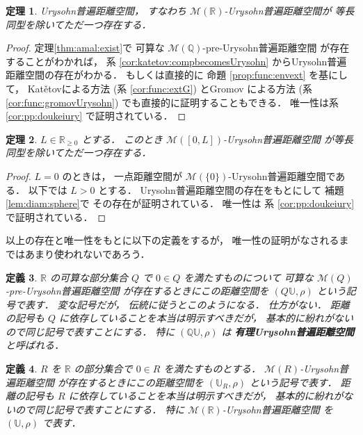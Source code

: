 \documentclass[leqno, 12pt]{jsarticle}
\newtheorem{thm}{定理}[section]
\newtheorem{df}[thm]{定義}
\renewcommand{\qq}{\mathbb{Q}}
\newcommand{\rr}{\mathbb{R}}
\newcommand{\Met}[1]{\mathscr{M}(#1)}
\newcommand{\Ury}{\mathbb{U}}
\newcommand{\UryOf}[1]{\Ury_{#1}}
\newcommand{\PreUryOf}[1]{#1\Ury}
\begin{document}
\begin{thm}\label{thm:intro:existpropUry}
Urysohn普遍距離空間，
すなわち
$\Met{\rr}$-Urysohn普遍距離空間が
等長同型を除いてただ一つ存在する．
\end{thm}
\begin{proof}
定理\ref{thm:amal:exist}で
可算な
$\Met{\qq}$-pre-Urysohn普遍距離空間
が存在することがわかれば，
系 \ref{cor:katetov:compbecomesUrysohn}
からUrysohn普遍距離空間の存在がわかる．
もしくは直接的に
命題
\ref{prop:func:envext}
を基にして，
Kat\v{e}tovによる方法
(系 \ref{cor:func:extG})
とGromov による方法
(系 \ref{cor:func:gromovUrysohn})
でも直接的に証明することもできる．
唯一性は系
\ref{cor:pp:doukeiury}
で証明されている．
\end{proof}


\begin{thm}\label{thm:intro:existdiam}
$L\in \rr_{\ge 0}$
とする．%
このとき
$\Met{[0, L]}$-Urysohn普遍距離空間
が等長同型を除いてただ一つ存在する．
\end{thm}


\begin{proof}
$L=0$
のときは，
一点距離空間が
$\Met{\{0\}}$-Urysohn普遍距離空間である．
以下では
$L>0$
とする．
Urysohn普遍距離空間の存在をもとにして
補題
\ref{lem:diam:sphere}で
その存在が証明されている．
唯一性は
系
\ref{cor:pp:doukeiury}
で証明されている．
\end{proof}


以上の存在と唯一性をもとに以下の定義をするが，
唯一性の証明がなされるまではあまり使われないであろう．



\begin{df}\label{df:intro:preUrysohnspaces}
$\rr$
の可算な部分集合
$Q$
で
$0\in Q$
を満たすものについて
可算な
$\Met{Q}$-pre-Urysohn普遍距離空間
が存在するときにこの距離空間を
$(\PreUryOf{Q}, \rho)$
という記号で表す．
変な記号だが，
伝統に従うとこのようになる．%
仕方がない．
距離の記号も
$Q$
に依存していることを本当は明示すべきだが，
基本的に紛れがないので同じ記号で表すことにする．
特に
$(\PreUryOf{\qq}, \rho)$
は
\textbf{有理Urysohn普遍距離空間}
と呼ばれる．
\end{df}




\begin{df}\label{df:intro:Urysohnspaces}
$R$
を
$\rr$
の部分集合で
$0\in R$
を満たすものとする．
$\Met{R}$-Urysohn普遍距離空間
が存在するときにこの距離空間を
$(\UryOf{R}, \rho)$
という記号で表す．
距離の記号も
$R$
に依存していることを本当は明示すべきだが，
基本的に紛れがないので同じ記号で表すことにする．
特に
$\Met{\rr}$-Urysohn普遍距離空間
を
$(\Ury, \rho)$
で表す．
\end{df}
\end{document}
